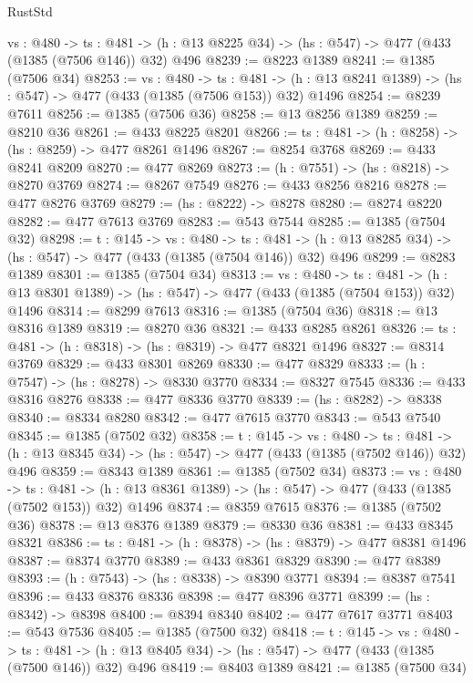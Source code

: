 \begin{lexlean}{RustStd}
\begin{coremodule}
{\begin{coremodule}
{{{{{{{{{{{{{{{{  {vs : @480} ->
  {ts : @481} -> (h : @13 @8225 @34) -> (hs : @547) -> @477 (@433 (@1385 (@7506 @146)) @32) @496
@8239 := @8223 @1389
@8241 := @1385 (@7506 @34)
@8253 := {vs : @480} ->
  {ts : @481} -> (h : @13 @8241 @1389) -> (hs : @547) -> @477 (@433 (@1385 (@7506 @153)) @32) @1496
@8254 := @8239 @7611
@8256 := @1385 (@7506 @36)
@8258 := @13 @8256 @1389
@8259 := @8210 @36
@8261 := @433 @8225 @8201
@8266 := {ts : @481} -> (h : @8258) -> (hs : @8259) -> @477 @8261 @1496
@8267 := @8254 @3768
@8269 := @433 @8241 @8209
@8270 := @477 @8269
@8273 := (h : @7551) -> (hs : @8218) -> @8270 @3769
@8274 := @8267 @7549
@8276 := @433 @8256 @8216
@8278 := @477 @8276 @3769
@8279 := (hs : @8222) -> @8278
@8280 := @8274 @8220
@8282 := @477 @7613 @3769
@8283 := @543 @7544
@8285 := @1385 (@7504 @32)
@8298 := {t : @145} ->
  {vs : @480} ->
  {ts : @481} -> (h : @13 @8285 @34) -> (hs : @547) -> @477 (@433 (@1385 (@7504 @146)) @32) @496
@8299 := @8283 @1389
@8301 := @1385 (@7504 @34)
@8313 := {vs : @480} ->
  {ts : @481} -> (h : @13 @8301 @1389) -> (hs : @547) -> @477 (@433 (@1385 (@7504 @153)) @32) @1496
@8314 := @8299 @7613
@8316 := @1385 (@7504 @36)
@8318 := @13 @8316 @1389
@8319 := @8270 @36
@8321 := @433 @8285 @8261
@8326 := {ts : @481} -> (h : @8318) -> (hs : @8319) -> @477 @8321 @1496
@8327 := @8314 @3769
@8329 := @433 @8301 @8269
@8330 := @477 @8329
@8333 := (h : @7547) -> (hs : @8278) -> @8330 @3770
@8334 := @8327 @7545
@8336 := @433 @8316 @8276
@8338 := @477 @8336 @3770
@8339 := (hs : @8282) -> @8338
@8340 := @8334 @8280
@8342 := @477 @7615 @3770
@8343 := @543 @7540
@8345 := @1385 (@7502 @32)
@8358 := {t : @145} ->
  {vs : @480} ->
  {ts : @481} -> (h : @13 @8345 @34) -> (hs : @547) -> @477 (@433 (@1385 (@7502 @146)) @32) @496
@8359 := @8343 @1389
@8361 := @1385 (@7502 @34)
@8373 := {vs : @480} ->
  {ts : @481} -> (h : @13 @8361 @1389) -> (hs : @547) -> @477 (@433 (@1385 (@7502 @153)) @32) @1496
@8374 := @8359 @7615
@8376 := @1385 (@7502 @36)
@8378 := @13 @8376 @1389
@8379 := @8330 @36
@8381 := @433 @8345 @8321
@8386 := {ts : @481} -> (h : @8378) -> (hs : @8379) -> @477 @8381 @1496
@8387 := @8374 @3770
@8389 := @433 @8361 @8329
@8390 := @477 @8389
@8393 := (h : @7543) -> (hs : @8338) -> @8390 @3771
@8394 := @8387 @7541
@8396 := @433 @8376 @8336
@8398 := @477 @8396 @3771
@8399 := (hs : @8342) -> @8398
@8400 := @8394 @8340
@8402 := @477 @7617 @3771
@8403 := @543 @7536
@8405 := @1385 (@7500 @32)
@8418 := {t : @145} ->
  {vs : @480} ->
  {ts : @481} -> (h : @13 @8405 @34) -> (hs : @547) -> @477 (@433 (@1385 (@7500 @146)) @32) @496
@8419 := @8403 @1389
@8421 := @1385 (@7500 @34)
}}}}}}}}}}}}}}}}
\end{coremodule}}
\end{coremodule}
\end{lexlean}
